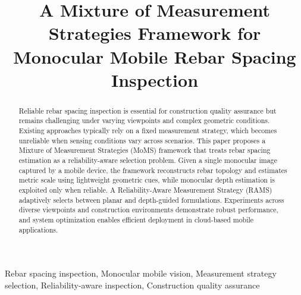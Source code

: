 \documentclass{article}
\title{A Mixture of Measurement Strategies Framework for Monocular Mobile Rebar Spacing Inspection}
\begin{document}
\topmargin=0mm
%
\maketitle
%

\begin{abstract}

Reliable rebar spacing inspection is essential for construction quality assurance but remains challenging under varying viewpoints and complex geometric conditions. Existing approaches typically rely on a fixed measurement strategy, which becomes unreliable when sensing conditions vary across scenarios. This paper proposes a Mixture of Measurement Strategies (MoMS) framework that treats rebar spacing estimation as a reliability-aware selection problem. Given a single monocular image captured by a mobile device, the framework reconstructs rebar topology and estimates metric scale using lightweight geometric cues, while monocular depth estimation is exploited only when reliable. A Reliability-Aware Measurement Strategy (RAMS) adaptively selects between planar and depth-guided formulations. Experiments across diverse viewpoints and construction environments demonstrate robust performance, and system optimization enables efficient deployment in cloud-based mobile applications.



\end{abstract}
%
\begin{keywords}
Rebar spacing inspection, Monocular mobile vision, Measurement strategy selection, Reliability-aware inspection, Construction quality assurance
\end{keywords}
%
\end{document}
